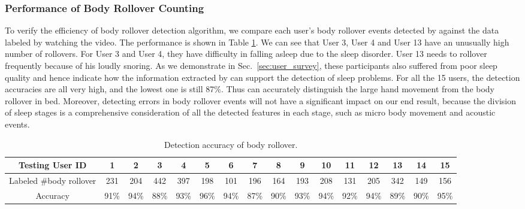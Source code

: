 \subsubsection{Performance of Body Rollover Counting}
To verify the efficiency of body rollover detection algorithm, we compare each user's body rollover events detected by {\systemname} against the data labeled by watching the video. The performance is shown in Table \ref{tab:rollver}. We can see that User 3, User 4 and User 13 have an unusually high number of rollovers. For User 3 and User 4, they have difficulty in falling asleep due to the sleep disorder. User 13 needs to rollover frequently because of his loudly snoring. As we demonstrate in Sec.~\ref{sec:user_survey}, these participants also suffered from poor sleep quality and hence indicate how the information extracted by {\systemname} can support the detection of sleep problems. For all the 15 users, the detection accuracies are all very high, and the lowest one is still 87\%. Thus {\systemname} can accurately distinguish the large hand movement from the body rollover in bed. Moreover, detecting errors in body rollover events will not have a significant impact on our end result, because the division of sleep stages is a comprehensive consideration of all the detected features in each stage, such as micro body movement and acoustic events.

\begin{table}[!thbp]\footnotesize
  \caption{Detection accuracy of body rollover.}\label{tab:rollver}
  \setlength{\tabcolsep}{3pt}
\renewcommand{\arraystretch}{0.67}{\multirowsetup}{\centering}
        \begin{tabular}{cccccccccccccccc}
        \toprule
         \textbf{Testing User ID}    & 1& 2  & 3& 4& 5& 6& 7& 8& 9& 10& 11& 12& 13& 14& 15\\
        \midrule
             {Labeled \#body rollover}  &231&204&442&397&198&101&196&164&193&208&131&205&342&149&156 \\
                 { Accuracy} &91\%& 94\% &88\%&93\%&96\%&94\%&87\%&90\% &93\% &94\% &92\% &94\% &89\% &90\% &95\%\\
        \bottomrule
 \end{tabular}
\end{table}

